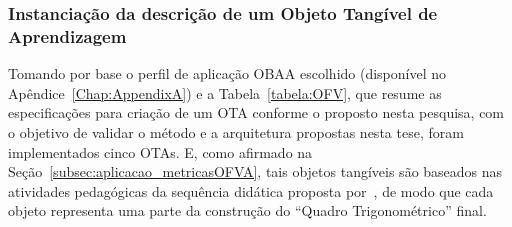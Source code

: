 \begin{table}[htb]
\begin{tabular}{|l|l|}
	\end{tabular}
	\label{tabela:OFV_estudo_caso1}
\end{table}

\subsubsection{Instanciação da descrição de um Objeto Tangível de Aprendizagem}\label{subsubsec:descricaoOFVA}
Tomando por base o perfil de aplicação OBAA escolhido (disponível no Apêndice~\ref{Chap:AppendixA}) e a Tabela~\ref{tabela:OFV}, que resume as especificações para criação de um OTA conforme o proposto nesta pesquisa, com o objetivo de validar o método e a arquitetura propostas nesta tese, foram implementados cinco OTAs. %
E, como afirmado na Seção~\ref{subsec:aplicacao_metricasOFVA}, tais objetos tangíveis são baseados nas atividades pedagógicas da sequência didática proposta por~\cite{silva:2011}, de modo que cada objeto representa uma parte da construção do ``Quadro Trigonométrico'' final.

